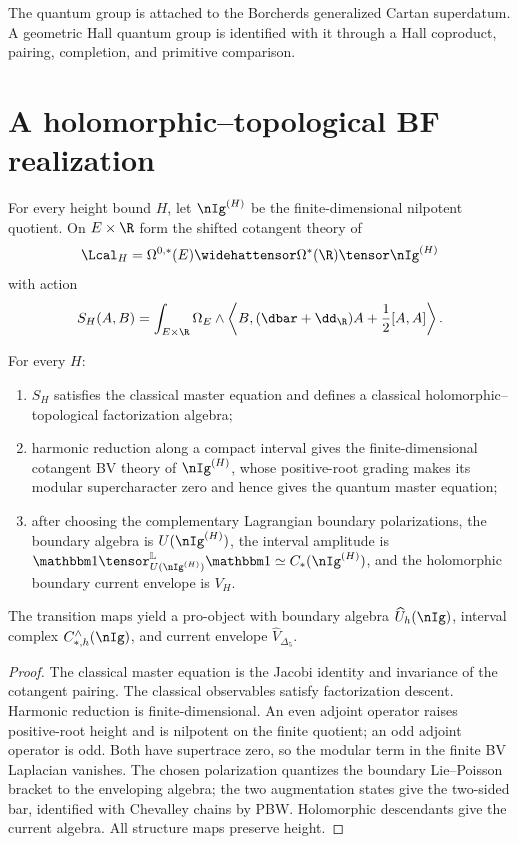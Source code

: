 \begin{remark}
The quantum group is attached to the Borcherds generalized Cartan superdatum.  A geometric Hall quantum group is identified with it through a Hall coproduct, pairing, completion, and primitive comparison.
\end{remark}

\chapter{A holomorphic--topological BF realization}
For every height bound $H$, let $\nIg^{(H)}$ be the finite-dimensional nilpotent quotient.  On $E\times\R$ form the shifted cotangent theory of
\[
 \Lcal_H=\Omega^{0,*}(E)\widehattensor\Omega^*(\R)\tensor\nIg^{(H)}
\]
with action
\[
 S_H(A,B)=\int_{E\times\R}\Omega_E\wedge
 \left\langle B,(\dbar+\dd_{\R})A+\frac12[A,A]\right\rangle .
\]

\begin{theorem}
For every $H$:
\begin{enumerate}
\item $S_H$ satisfies the classical master equation and defines a classical holomorphic--topological factorization algebra;
\item harmonic reduction along a compact interval gives the finite-dimensional cotangent BV theory of $\nIg^{(H)}$, whose positive-root grading makes its modular supercharacter zero and hence gives the quantum master equation;
\item after choosing the complementary Lagrangian boundary polarizations, the boundary algebra is $U(\nIg^{(H)})$, the interval amplitude is $\mathbbm1\tensor^{\mathbb L}_{U(\nIg^{(H)})}\mathbbm1\simeq C_*(\nIg^{(H)})$, and the holomorphic boundary current envelope is $V_H$.
\end{enumerate}
The transition maps yield a pro-object with boundary algebra $\widehat U_h(\nIg)$, interval complex $C_{*,h}^{\wedge}(\nIg)$, and current envelope $\widehat V_{\Delta_5}$.
\end{theorem}
\begin{proof}
The classical master equation is the Jacobi identity and invariance of the cotangent pairing.  The classical observables satisfy factorization descent.  Harmonic reduction is finite-dimensional.  An even adjoint operator raises positive-root height and is nilpotent on the finite quotient; an odd adjoint operator is odd.  Both have supertrace zero, so the modular term in the finite BV Laplacian vanishes.  The chosen polarization quantizes the boundary Lie--Poisson bracket to the enveloping algebra; the two augmentation states give the two-sided bar, identified with Chevalley chains by PBW.  Holomorphic descendants give the current algebra.  All structure maps preserve height.
\end{proof}

